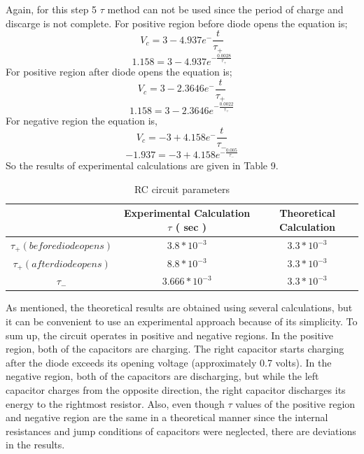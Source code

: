 \documentclass[letterpaper,12pt]{article}
\begin{document}
Again, for this step 5 \(\tau\) method can not be used since the period of charge and discarge is not complete.
For positive region before diode opens the equation is;
\[V_c = 3 - 4.937e^-\frac{t}{\tau_+}\]
\[1.158 = 3 - 4.937e^{-\frac{0.0028}{\tau_+}} \]
For positive region after diode opens the equation is;
\[V_c = 3 - 2.3646e^-\frac{t}{\tau_+}\]
\[1.158 = 3 - 2.3646e^{-\frac{0.0022}{\tau_+}} \]
For negative region the equation is, 
\[V_c = -3 + 4.158e^-\frac{t}{\tau_-}\]
\[ -1.937 = - 3 + 4.158e^{-\frac{0.005}{\tau_-}} \]
So the results of experimental calculations are given in Table 9.
\begin{table}[H]
	\begin{center}
	\caption{RC circuit parameters}
	\vspace{2mm}
		\begin{tabular}{|| c | c |c ||} 
		 \hline
		  &Experimental Calculation \(\tau\) ( sec )& Theoretical Calculation \\ [0.5ex] 
		 \hline\hline
		 \(\tau_+ (before diode opens)\)&\(3.8*10^{-3}\)&\(3.3*10^{-3}\)    \\ 
	 \hline
	 \(\tau_+ (after diode opens)\)&\(8.8*10^{-3}\)&\(3.3*10^{-3}\)    \\ 
	 \hline
	 \(\tau_-\)& \(3.666*10^{-3}\)& \(3.3*10^{-3}\) \\
	 \hline
\end{tabular}
\end{center}
\end{table}
As mentioned, the theoretical results are obtained using several calculations, but it can be convenient to use an experimental approach because of its simplicity. To sum up, the circuit operates in positive and negative regions. In the positive region, both of the capacitors are charging. The right capacitor starts charging after the diode exceeds its opening voltage (approximately 0.7 volts). In the negative region, both of the capacitors are discharging, but while the left capacitor charges from the opposite direction, the right capacitor discharges its energy to the rightmost resistor. Also, even though \(\tau\) values of the positive region and negative region are the same in a theoretical manner since the internal resistances and jump conditions of capacitors were neglected, there are deviations in the results.

 
\end{document}

